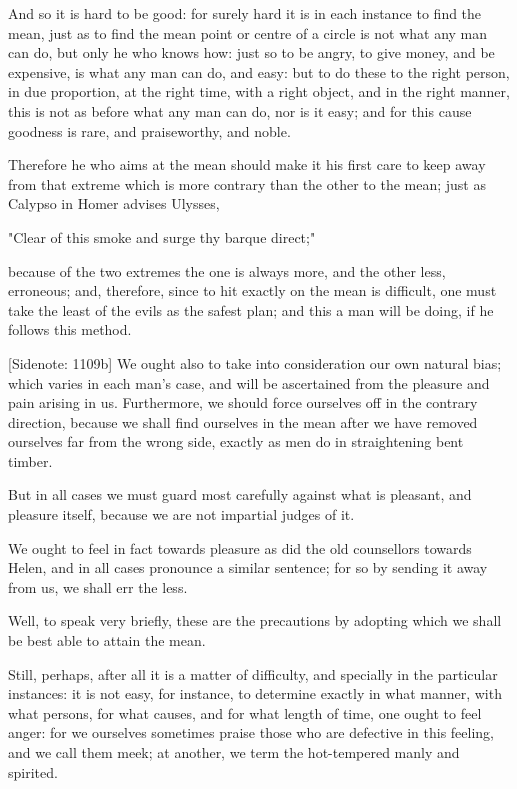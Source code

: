 And so it is hard to be good: for surely hard it is in each instance to
find the mean, just as to find the mean point or centre of a circle is
not what any man can do, but only he who knows how: just so to be angry,
to give money, and be expensive, is what any man can do, and easy: but
to do these to the right person, in due proportion, at the right time,
with a right object, and in the right manner, this is not as before what
any man can do, nor is it easy; and for this cause goodness is rare, and
praiseworthy, and noble.

Therefore he who aims at the mean should make it his first care to keep
away from that extreme which is more contrary than the other to the
mean; just as Calypso in Homer advises Ulysses,

  "Clear of this smoke and surge thy barque direct;"

because of the two extremes the one is always more, and the other
less, erroneous; and, therefore, since to hit exactly on the mean is
difficult, one must take the least of the evils as the safest plan; and
this a man will be doing, if he follows this method.

[Sidenote: 1109b] We ought also to take into consideration our own
natural bias; which varies in each man's case, and will be ascertained
from the pleasure and pain arising in us. Furthermore, we should force
ourselves off in the contrary direction, because we shall find ourselves
in the mean after we have removed ourselves far from the wrong side,
exactly as men do in straightening bent timber.

But in all cases we must guard most carefully against what is pleasant,
and pleasure itself, because we are not impartial judges of it.

We ought to feel in fact towards pleasure as did the old counsellors
towards Helen, and in all cases pronounce a similar sentence; for so by
sending it away from us, we shall err the less.

Well, to speak very briefly, these are the precautions by adopting which
we shall be best able to attain the mean.

Still, perhaps, after all it is a matter of difficulty, and specially
in the particular instances: it is not easy, for instance, to determine
exactly in what manner, with what persons, for what causes, and for what
length of time, one ought to feel anger: for we ourselves sometimes
praise those who are defective in this feeling, and we call them meek;
at another, we term the hot-tempered manly and spirited.

